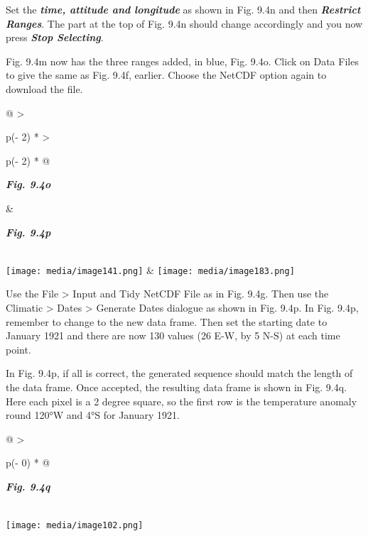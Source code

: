 \documentclass[
  letterpaper,
  DIV=11,
  numbers=noendperiod]{scrreprt}
\begin{document}
Set the \textbf{\emph{time, attitude and longitude}} as shown in Fig.
9.4n and then \textbf{\emph{Restrict Ranges}}. The part at the top of
Fig. 9.4n should change accordingly and you now press \textbf{\emph{Stop
Selecting}}.

Fig. 9.4m now has the three ranges added, in blue, Fig. 9.4o. Click on
Data Files to give the same as Fig. 9.4f, earlier. Choose the NetCDF
option again to download the file.

\begin{longtable}[]{@{}
  >{\raggedright\arraybackslash}p{(\columnwidth - 2\tabcolsep) * }
  >{\raggedright\arraybackslash}p{(\columnwidth - 2\tabcolsep) * }@{}}
\toprule\noalign{}
\begin{minipage}[b]{\linewidth}\raggedright
\textbf{\emph{Fig. 9.4o}}
\end{minipage} & \begin{minipage}[b]{\linewidth}\raggedright
\textbf{\emph{Fig. 9.4p}}
\end{minipage} \\
\midrule\noalign{}
\endhead
\bottomrule\noalign{}
\endlastfoot
\texttt{[image: media/image141.png]} &
\texttt{[image: media/image183.png]} \\
\end{longtable}

Use the File \textgreater{} Input and Tidy NetCDF File as in Fig. 9.4g.
Then use the Climatic \textgreater{} Dates \textgreater{} Generate Dates
dialogue as shown in Fig. 9.4p. In Fig. 9.4p, remember to change to the
new data frame. Then set the starting date to January 1921 and there are
now 130 values (26 E-W, by 5 N-S) at each time point.

In Fig. 9.4p, if all is correct, the generated sequence should match the
length of the data frame. Once accepted, the resulting data frame is
shown in Fig. 9.4q. Here each pixel is a 2 degree square, so the first
row is the temperature anomaly round 120°W and 4°S for January 1921.

\begin{longtable}[]{@{}
  >{\raggedright\arraybackslash}p{(\columnwidth - 0\tabcolsep) * }@{}}
\toprule\noalign{}
\begin{minipage}[b]{\linewidth}\raggedright
\textbf{\emph{Fig. 9.4q}}
\end{minipage} \\
\midrule\noalign{}
\endhead
\bottomrule\noalign{}
\endlastfoot
\texttt{[image: media/image102.png]} \\
\end{longtable}
\end{document}
